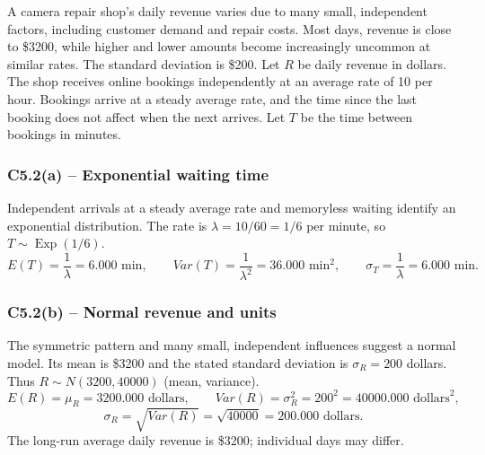 {
A camera repair shop's daily revenue varies due to many small, independent
factors, including customer demand and repair costs. Most days, revenue
is close to \$3200, while higher and lower amounts become increasingly
uncommon at similar rates. The standard deviation is \$200.
Let $R$ be daily revenue in dollars.
The shop receives online bookings independently at an average rate of
10 per hour. Bookings arrive at a steady average rate, and the time since
the last booking does not affect when the next arrives.
Let $T$ be the time between bookings in minutes.
\label{sol:c5-2a}
\subsubsection*{C5.2(a) -- Exponential waiting time }
Independent arrivals at a steady average rate and memoryless waiting identify
an exponential distribution. The rate is $\lambda=10/60=1/6$ per minute,
so $T\sim\operatorname{Exp}(1/6)$.
\[
E(T)=\frac{1}{\lambda}=6.000\text{ min},\qquad
Var(T)=\frac{1}{\lambda^2}=36.000\text{ min}^2,\qquad
\sigma_T=\frac{1}{\lambda}=6.000\text{ min}.
\]
\label{sol:c5-2b}
\subsubsection*{C5.2(b) -- Normal revenue and units }
The symmetric pattern and many small, independent influences suggest a normal
model. Its mean is \$3200 and the stated standard deviation is
$\sigma_R=200$ dollars.
Thus $R\sim N(3200,40000)$ (mean, variance).
\[
E(R)=\mu_R=3200.000\text{ dollars},\qquad
Var(R)=\sigma_R^2=200^2=40000.000\text{ dollars}^2,
\]
\[
\sigma_R=\sqrt{Var(R)}=\sqrt{40000}=200.000\text{ dollars}.
\]
The long-run average daily revenue is \$3200; individual days may differ.
\secInicio[sec:c5-2]

}

